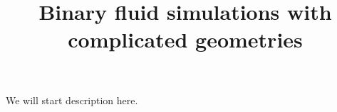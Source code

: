 \documentclass{article}
\title{Binary fluid simulations with complicated geometries}
\begin{document}
\maketitle
We will start description here.
\end{document}
